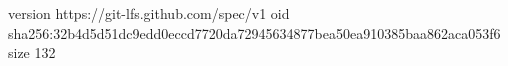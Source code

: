 version https://git-lfs.github.com/spec/v1
oid sha256:32b4d5d51dc9edd0eccd7720da72945634877bea50ea910385baa862aca053f6
size 132
